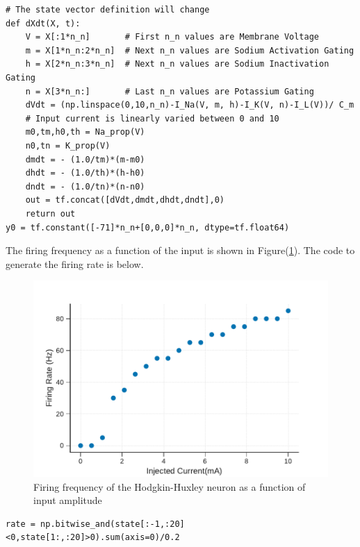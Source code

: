 \documentclass[10pt,letterpaper]{article}
\begin{document}
\begin{nolinenumbers}
\begin{verbatim}
# The state vector definition will change
def dXdt(X, t):
    V = X[:1*n_n]       # First n_n values are Membrane Voltage
    m = X[1*n_n:2*n_n]  # Next n_n values are Sodium Activation Gating
    h = X[2*n_n:3*n_n]  # Next n_n values are Sodium Inactivation Gating
    n = X[3*n_n:]       # Last n_n values are Potassium Gating
    dVdt = (np.linspace(0,10,n_n)-I_Na(V, m, h)-I_K(V, n)-I_L(V))/ C_m 
    # Input current is linearly varied between 0 and 10
    m0,tm,h0,th = Na_prop(V)
    n0,tn = K_prop(V)
    dmdt = - (1.0/tm)*(m-m0)
    dhdt = - (1.0/th)*(h-h0)
    dndt = - (1.0/tn)*(n-n0)
    out = tf.concat([dVdt,dmdt,dhdt,dndt],0)
    return out
y0 = tf.constant([-71]*n_n+[0,0,0]*n_n, dtype=tf.float64)
\end{verbatim}
The firing frequency as a function of the input is shown in Figure(\ref{fig:freq}). The code to generate the firing rate is below.
\begin{center}
\begin{figure}
\includegraphics[scale=0.6]{Figures/fig12.pdf} 
\caption{ Firing frequency of the Hodgkin-Huxley neuron as a function of input amplitude}
\label{fig:freq}
\end{figure}
\end{center}

\begin{verbatim}
rate = np.bitwise_and(state[:-1,:20]<0,state[1:,:20]>0).sum(axis=0)/0.2
\end{verbatim}


\end{nolinenumbers}
\end{document}
